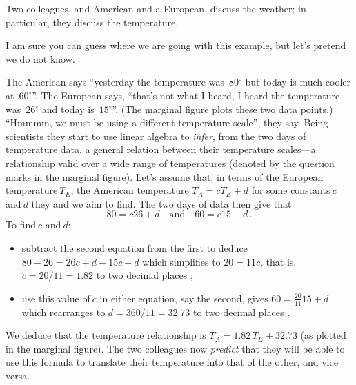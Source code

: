 \begin{example} \label{eg:infertemp}
Two colleagues, and American and a European, discuss the weather; in particular, they discuss the temperature.
\begin{aside}
I am sure you can guess where we are going with this example, but let's pretend we do not know.
\end{aside}
The American says ``yesterday the temperature was~\(80^\circ\) but today is much cooler at~\(60^\circ\)''.
The European says, ``that's not what I heard, I heard the temperature was~\(26^\circ\) and today is~\(15^\circ\)''.
(The marginal figure plots these two data points.)
%
``Hmmmm, we must be using a different temperature scale'', they say.
Being scientists they start to use linear algebra to \emph{infer}, from the two days of temperature data, a general relation between their temperature scales---a relationship valid over a wide range of temperatures (denoted by the question marks in the marginal figure).
Let's assume that, in terms of the European temperature\(~T_E\), the American temperature \(T_A=cT_E+d\) for some constants\(~c\) and\(~d\) they and we aim to find.
The two days of data then give that
\begin{equation*}
80=c26+d\quad\text{and}\quad 60=c15+d\,.
\end{equation*}
To find\(~c\) and\(~d\):
\begin{itemize}
\item subtract the second equation from the first to deduce \(80-26=26c+d-15c-d\) which simplifies to \(20=11c\), that is, \(c=20/11=1.82\) to two decimal places \twodp;
\item use this value of\(~c\) in either equation, say the second, gives \(60=\frac{20}{11}15+d\) which rearranges to \(d=360/11=32.73\)  to two decimal places \twodp.
\end{itemize}
%
We deduce that the temperature relationship is \(T_A=1.82\,T_E+32.73\) (as plotted in the marginal figure).
The two colleagues now \emph{predict} that they will be able to use this formula to translate their temperature into that of the other, and vice versa.


\end{example}

